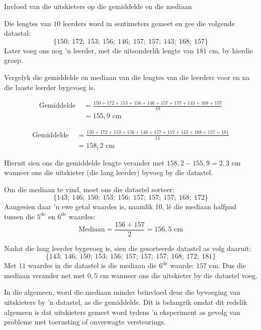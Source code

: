 \begin{wex}{Invloed van die uitskieters op die gemiddelde en die mediaan}
{Die lengtes van $10$ leerders word in sentimeters gemeet en gee die volgende datastal:
    \begin{equation*}
      \{150;\ 172;\ 153;\ 156;\ 146;\ 157;\ 157;\ 143;\ 168;\ 157\}
    \end{equation*}
    Later voeg ons nog ’n leerder, met die uitsonderlik lengte van $181$ cm, by hierdie groep.

   Vergelyk die gemiddelde en mediaan van die lengtes van die leerders voor en na die laaste leerder bygevoeg is.
}{

  \begin{align*}
    \mbox{Gemiddelde } &=\frac{150 + 172 + 153 + 156 + 146 + 157 + 157 + 143 + 168 + 157}{10}\\
    &= 155,9\mbox{ cm}
  \end{align*}


  \begin{align*}
    \mbox{Gemiddelde } &= \frac{150 + 172 + 153 + 156 + 146 + 157 + 157 + 143 + 168 + 157 + 181}{11}\\
    &= 158,2\mbox{ cm}
  \end{align*}

  Hieruit sien ons die gemiddelde lengte verander met 
  $158,2 - 155,9 = 2,3\mbox{ cm}$ wanneer ons die uitskieter (die lang leerder) byvoeg by die datastel.


  Om die mediaan te vind, moet ons die datastel sorteer:
  \begin{equation*}
    \{143;\ 146;\ 150;\ 153;\ 156;\ 157;\ 157;\ 157;\ 168;\ 172\}
  \end{equation*}
  Aangesien daar ’n ewe getal waardes is, naamlik 10, lê die mediaan halfpad tussen die $5^{\mathrm{de}}$ en $6^{\mathrm{de}}$ waardes:
  \begin{equation*}
    \mbox{Mediaan} =\frac{156+157}{2} = 156,5\mbox{ cm}
  \end{equation*}


  Nadat die lang leerder bygevoeg is, sien die gesorteerde datastel as volg daaruit:
  \begin{equation*}
    \{143;\ 146;\ 150;\ 153;\ 156;\ 157;\ 157;\ 157;\ 168;\ 172;\ 181\}
  \end{equation*}
  Met $11$ waardes in die datastel is die mediaan die $6^{\mathrm{de}}$ waarde: $157$ cm.
  Dus die mediaan verander net met $0,5$ cm wanneer ons die uitskieter by die datastel voeg.

 In die algemeen, word die mediaan minder beïnvloed deur die byvoeging van uitskieters by ’n datastel, as die gemiddelde. Dit is belangrik omdat dit redelik algemeen is dat uitskieters gemeet word tydens ’n eksperiment as gevolg van probleme met toerusting of onverwagte versteurings.
}
\end{wex}


